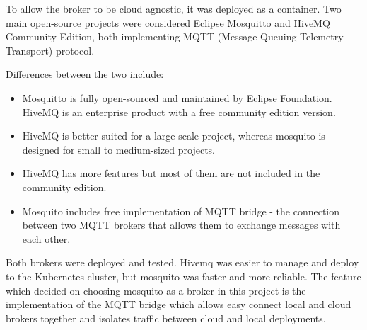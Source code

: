 To allow the broker to be cloud agnostic, it was deployed as a container. Two main open-source projects were considered Eclipse Mosquitto and HiveMQ Community Edition, both implementing MQTT (Message Queuing Telemetry Transport) protocol.

Differences between the two include:

\begin{itemize}
    \item Mosquitto is fully open-sourced and maintained by Eclipse Foundation. HiveMQ is an enterprise product with a free community edition version.
    \item HiveMQ is better suited for a large-scale project, whereas mosquito is designed for small to medium-sized projects.
    \item HiveMQ has more features but most of them are not included in the community edition.
    \item Mosquito includes free implementation of MQTT bridge - the connection between two MQTT brokers that allows them to exchange messages with each other.
\end{itemize}

Both brokers were deployed and tested. Hivemq was easier to manage and deploy to the Kubernetes cluster, but mosquito was faster and more reliable. The feature which decided on choosing mosquito as a broker in this project is the implementation of the MQTT bridge which allows easy connect local and cloud brokers together and isolates traffic between cloud and local deployments.